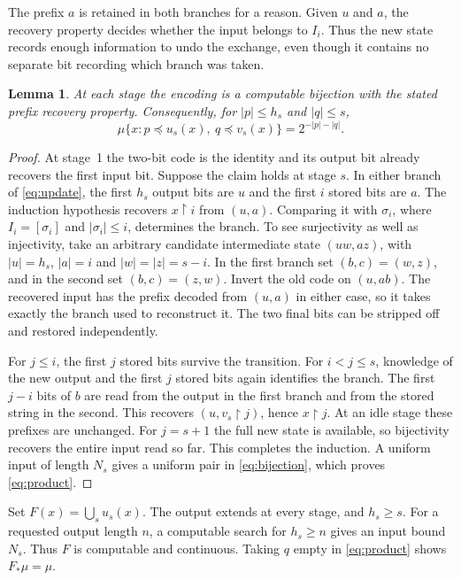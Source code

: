 \documentclass[12pt,reqno]{amsart}
\newtheorem{lemma}[theorem]{Lemma}
\newcommand{\pre}{\mathbin{\upharpoonright}}
\newcommand{\mass}{\mu}
\begin{document}
The prefix $a$ is retained in both branches for a reason. Given $u$ and $a$,
the recovery property decides whether the input belongs to $I_i$. Thus the
new state records enough information to undo the exchange, even though it
contains no separate bit recording which branch was taken.

\begin{lemma}\label{lem:finite}
At each stage the encoding is a computable bijection with the stated
prefix recovery property. Consequently, for $|p|\le h_s$ and $|q|\le s$,
\begin{equation}\label{eq:product}
   \mass\{x:p\preceq u_s(x),\ q\preceq v_s(x)\}
       =2^{-|p|-|q|}.
\end{equation}
\end{lemma}
\begin{proof}
At stage~1 the two-bit code is the identity and its output bit
already recovers the first input bit. Suppose the claim holds at stage $s$.
In either branch of \eqref{eq:update}, the first $h_s$
output bits are $u$ and the first $i$ stored bits are $a$. The induction
hypothesis recovers $x\pre i$ from $(u,a)$. Comparing it with $\sigma_i$,
where $I_i=[\sigma_i]$ and $|\sigma_i|\le i$, determines the branch.
To see surjectivity as well as injectivity, take an arbitrary candidate
intermediate state $(uw,az)$, with $|u|=h_s$, $|a|=i$ and
$|w|=|z|=s-i$. In the first branch set $(b,c)=(w,z)$, and in the
second set $(b,c)=(z,w)$. Invert the old code on $(u,ab)$. The recovered
input has the prefix decoded from $(u,a)$ in either case, so it takes
exactly the branch used to reconstruct it. The two final bits can be
stripped off and restored independently.

For $j\le i$, the first $j$ stored bits survive the transition. For
$i<j\le s$, knowledge of the new output and the first $j$ stored bits
again identifies the branch. The first $j-i$ bits of $b$ are read from
the output in the first branch and from the stored string in the second.
This recovers $(u,v_s\pre j)$, hence $x\pre j$. At an idle stage these
prefixes are unchanged. For $j=s+1$ the full new state is available, so
bijectivity recovers the entire input read so far. This completes the
induction. A uniform input of length $N_s$ gives a uniform pair in
\eqref{eq:bijection}, which proves \eqref{eq:product}.
\end{proof}

Set $F(x)=\bigcup_s u_s(x)$. The output extends at every stage, and
$h_s\ge s$. For a requested output length $n$, a computable search for
$h_s\ge n$ gives an input bound $N_s$. Thus $F$ is computable and
continuous. Taking $q$ empty in \eqref{eq:product} shows $F_*\mass=\mass$.
\end{document}
